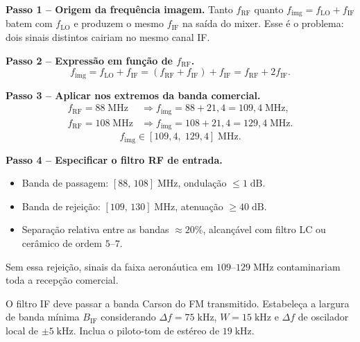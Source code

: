 \documentclass[11pt,a4paper]{article}
\begin{document}
\begin{resolucao}

\textbf{Passo 1 -- Origem da frequência imagem.} Tanto $f_{\text{RF}}$ quanto $f_{\text{img}} = f_{\text{LO}} + f_{\text{IF}}$ batem com $f_{\text{LO}}$ e produzem o mesmo $f_{\text{IF}}$ na saída do mixer. Esse é o problema: dois sinais distintos cairiam no mesmo canal IF.

\textbf{Passo 2 -- Expressão em função de $f_{\text{RF}}$.}
\[
  f_{\text{img}} = f_{\text{LO}} + f_{\text{IF}} = (f_{\text{RF}} + f_{\text{IF}}) + f_{\text{IF}} = f_{\text{RF}} + 2 f_{\text{IF}}.
\]

\textbf{Passo 3 -- Aplicar nos extremos da banda comercial.}
\begin{align*}
  f_{\text{RF}} = 88\;\text{MHz} &\Rightarrow f_{\text{img}} = 88 + 21{,}4 = 109{,}4\;\text{MHz}, \\
  f_{\text{RF}} = 108\;\text{MHz} &\Rightarrow f_{\text{img}} = 108 + 21{,}4 = 129{,}4\;\text{MHz}.
\end{align*}
\[
  \boxed{f_{\text{img}} \in [109{,}4,\; 129{,}4]\;\text{MHz}.}
\]

\textbf{Passo 4 -- Especificar o filtro RF de entrada.}
\begin{itemize}\itemsep0pt
  \item Banda de passagem: $[88,\,108]\;\text{MHz}$, ondulação $\le 1\;\text{dB}$.
  \item Banda de rejeição: $[109,\,130]\;\text{MHz}$, atenuação $\ge 40\;\text{dB}$.
  \item Separação relativa entre as bandas $\approx 20\%$, alcançável com filtro LC ou cerâmico de ordem $5$--$7$.
\end{itemize}

Sem essa rejeição, sinais da faixa aeronáutica em $109$--$129\;\text{MHz}$ contaminariam toda a recepção comercial.
\end{resolucao}

\begin{enunciado}[Item c)]
O filtro IF deve passar a banda Carson do FM transmitido. Estabeleça a largura de banda mínima $B_{\text{IF}}$ considerando $\Delta f = 75\;\text{kHz}$, $W = 15\;\text{kHz}$ e $\Delta f$ de oscilador local de $\pm 5\;\text{kHz}$. Inclua o piloto-tom de estéreo de $19\;\text{kHz}$.
\end{enunciado}
\end{document}
